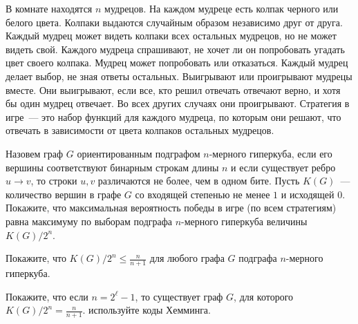 В комнате находятся $n$ мудрецов. На каждом мудреце есть колпак черного или белого цвета. Колпаки
выдаются случайным образом независимо друг от друга. Каждый мудрец может видеть колпаки всех остальных
мудрецов, но не может видеть свой. Каждого мудреца спрашивают, не хочет ли он попробовать угадать цвет
своего колпака. Мудрец может попробовать или отказаться. Каждый мудрец делает выбор, не зная ответы
остальных. Выигрывают или проигрывают мудрецы вместе. Они выигрывают, если все, кто решил отвечать
отвечают верно, и хотя бы один мудрец отвечает. Во всех других случаях они проигрывают. Стратегия в
игре~--- это набор функций для каждого мудреца, по которым они решают, что отвечать в зависимости от
цвета колпаков остальных мудрецов.
\begin{enumcyr}
    \item Назовем граф $G$ ориентированным подграфом $n$-мерного гиперкуба, если его вершины
        соответствуют бинарным строкам длины $n$ и если существует ребро $u \rightarrow v$, то строки $u,
        v$ различаются не более, чем в одном бите. Пусть $K(G)$~--- количество вершин в графе $G$ со
        входящей степенью не менее $1$ и исходящей $0$. Покажите, что максимальная вероятность победы в
        игре (по всем стратегиям) равна максимуму по выборам подграфа $n$-мерного гиперкуба величины
        $K(G) / 2^n$.
    \item Покажите, что $K(G) / 2^n \le \frac{n}{n + 1}$ для любого графа $G$ подграфа $n$-мерного
        гиперкуба.
    \item Покажите, что если $n = 2^{\ell} - 1$, то существует граф $G$, для которого $K(G) / 2^n =
        \frac{n}{n + 1}$.  используйте коды Хемминга.
\end{enumcyr}